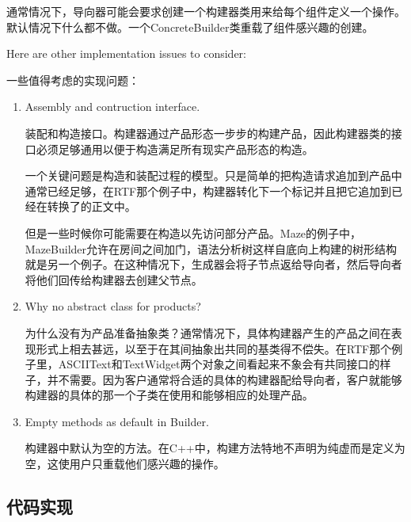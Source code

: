 通常情况下，导向器可能会要求创建一个构建器类用来给每个组件定义一个操作。默认情况下什么都不做。一个ConcreteBuilder类重载了组件感兴趣的创建。

Here are other implementation issues to consider:

一些值得考虑的实现问题：

\begin{enumerate}

\item Assembly and contruction interface.

	  装配和构造接口。构建器通过产品形态一步步的构建产品，因此构建器类的接口必须足够通用以便于构造满足所有现实产品形态的构造。

	  一个关键问题是构造和装配过程的模型。只是简单的把构造请求追加到产品中通常已经足够，在RTF那个例子中，构建器转化下一个标记并且把它追加到已经在转换了的正文中。

	  但是一些时候你可能需要在构造以先访问部分产品。Maze的例子中，MazeBuilder允许在房间之间加门，语法分析树这样自底向上构建的树形结构就是另一个例子。在这种情况下，生成器会将子节点返给导向者，然后导向者将他们回传给构建器去创建父节点。

\item Why no abstract class for products?

	  为什么没有为产品准备抽象类？通常情况下，具体构建器产生的产品之间在表现形式上相去甚远，以至于在其间抽象出共同的基类得不偿失。在RTF那个例子里，ASCIIText和TextWidget两个对象之间看起来不象会有共同接口的样子，并不需要。因为客户通常将合适的具体的构建器配给导向者，客户就能够构建器的具体的那一个子类在使用和能够相应的处理产品。

\item Empty methods as default in Builder.

      构建器中默认为空的方法。在C++中，构建方法特地不声明为纯虚而是定义为空，这使用户只重载他们感兴趣的操作。

\end{enumerate}

\subsection{代码实现}




